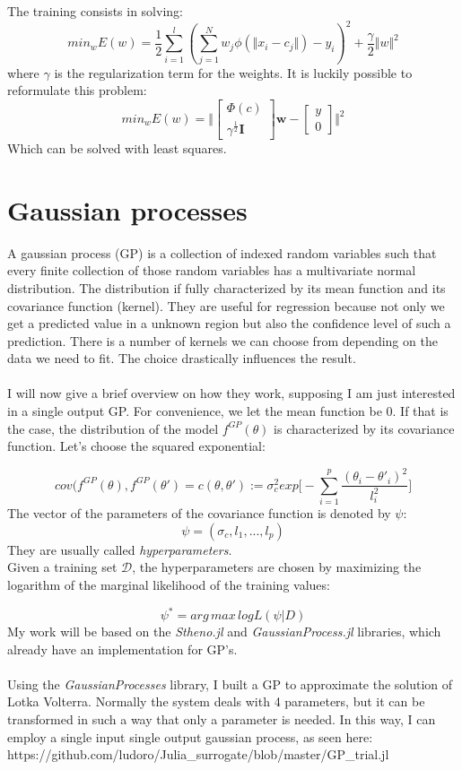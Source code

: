 \documentclass[11pt,a4paper,oneside,titlepage,openright]{book}
\begin{document}
The training consists in solving:
\begin{equation}
min_{w}E(w) = \frac{1}{2}\sum_{i=1}^l (\sum_{j=1}^N w_j \phi(\Vert x_i - c_j \Vert) - y_i)^2 + \frac{\gamma}{2} \Vert w \Vert^2 
\end{equation}
where $\gamma$ is the regularization term for the weights. It is luckily possible to reformulate this problem: 
$$ min_{w}E(w) = \Big\Vert \begin{bmatrix} \Phi(c) \\ \gamma^{\frac{1}{2}}\text{}\mathbf{I}\end{bmatrix}\mathbf{w} - \begin{bmatrix} y \\ 0 \end{bmatrix}\Big\Vert^2$$ 
Which can be solved with least squares.

\section*{Gaussian processes}
A gaussian process (GP) is a collection of indexed random variables such that every finite collection of those random variables has a multivariate normal distribution. The distribution if fully characterized by its mean function and its covariance function (kernel). They are useful for regression because not only we get a predicted value in a unknown region but also the confidence level of such a prediction. 
There is a number of kernels we can choose from depending on the data we need to fit. The choice drastically influences the result.\\\\
I will now give a brief overview on how they work, supposing I am just interested in a single output GP. 
For convenience, we let the mean function be 0. If that is the case, the distribution of the model $f^{GP}(\theta)$
is characterized by its covariance function. Let's choose the squared exponential:

$$ cov(f^{GP}(\theta),f^{GP}(\theta') = c(\theta,\theta') := \sigma^2_c exp\Big[-\sum_{i=1}^p \frac{(\theta_i - \theta'_i)^2}{l^2_i} \Big] $$
The vector of the parameters of the covariance function is denoted by $\psi$:
$$ \psi = (\sigma_c, l_1, ... , l_p)$$
They are usually called \textit{hyperparameters}.\\
Given a training set $\mathcal{D}$, the hyperparameters are chosen by maximizing the logarithm of the marginal likelihood of the training values:

$$ \psi^* = {arg\,max \,} log L (\psi \vert D) $$
My work will be based on the \textit{Stheno.jl} and \textit{GaussianProcess.jl} libraries, which already have an implementation for GP's.\\\\
Using the \textit{GaussianProcesses} library, I built a GP to approximate the solution of Lotka Volterra. 
Normally the system deals with 4 parameters, but it can be transformed in such a way that only a parameter is needed. In this way, I can employ a single input single output gaussian process, as seen here: 
https://github.com/ludoro/Julia\_surrogate/blob/master/GP\_trial.jl
\end{document}
